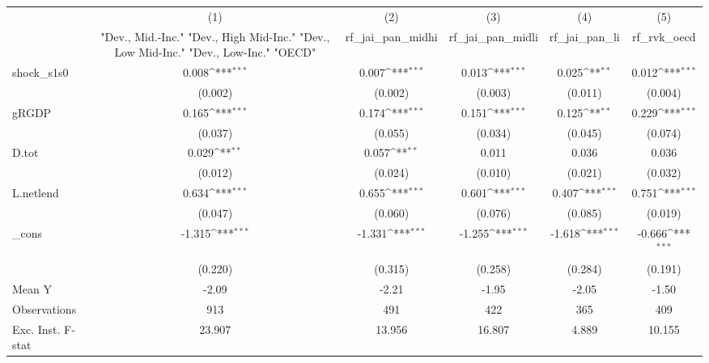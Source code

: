 {
\def\sym#1{\ifmmode^{#1}\else\(^{#1}\)\fi}
\begin{tabular}{l*{5}{c}}
\toprule
            &\multicolumn{1}{c}{(1)}&\multicolumn{1}{c}{(2)}&\multicolumn{1}{c}{(3)}&\multicolumn{1}{c}{(4)}&\multicolumn{1}{c}{(5)}\\
            &\multicolumn{1}{c}{ "Dev., Mid.-Inc." "Dev., High Mid-Inc." "Dev., Low Mid-Inc." "Dev., Low-Inc." "OECD" }&\multicolumn{1}{c}{rf\_jai\_pan\_midhi}&\multicolumn{1}{c}{rf\_jai\_pan\_midli}&\multicolumn{1}{c}{rf\_jai\_pan\_li}&\multicolumn{1}{c}{rf\_rvk\_oecd}\\
\midrule
shock\_s1s0  &       0.008\sym{***}&       0.007\sym{***}&       0.013\sym{***}&       0.025\sym{**} &       0.012\sym{***}\\
            &     (0.002)         &     (0.002)         &     (0.003)         &     (0.011)         &     (0.004)         \\
\addlinespace
gRGDP       &       0.165\sym{***}&       0.174\sym{***}&       0.151\sym{***}&       0.125\sym{**} &       0.229\sym{***}\\
            &     (0.037)         &     (0.055)         &     (0.034)         &     (0.045)         &     (0.074)         \\
\addlinespace
D.tot       &       0.029\sym{**} &       0.057\sym{**} &       0.011         &       0.036         &       0.036         \\
            &     (0.012)         &     (0.024)         &     (0.010)         &     (0.021)         &     (0.032)         \\
\addlinespace
L.netlend   &       0.634\sym{***}&       0.655\sym{***}&       0.601\sym{***}&       0.407\sym{***}&       0.751\sym{***}\\
            &     (0.047)         &     (0.060)         &     (0.076)         &     (0.085)         &     (0.019)         \\
\addlinespace
\_cons      &      -1.315\sym{***}&      -1.331\sym{***}&      -1.255\sym{***}&      -1.618\sym{***}&      -0.666\sym{***}\\
            &     (0.220)         &     (0.315)         &     (0.258)         &     (0.284)         &     (0.191)         \\
\midrule
Mean Y      &       -2.09         &       -2.21         &       -1.95         &       -2.05         &       -1.50         \\
Observations&         913         &         491         &         422         &         365         &         409         \\
Exc. Inst. F-stat&      23.907         &      13.956         &      16.807         &       4.889         &      10.155         \\
\bottomrule
\end{tabular}
}
